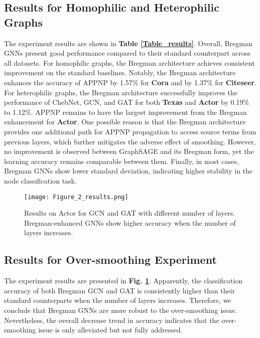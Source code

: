 \documentclass{article}
\begin{document}
\subsection{Results for Homophilic and Heterophilic Graphs}
The experiment results are shown in \textbf{Table \ref{Table_results}}. Overall, Bregman GNNs present good performance compared to their standard counterpart across all datasets. For homophilic graphs, the Bregman architecture achieves consistent improvement on the standard baselines. Notably, the Bregman architecture enhances the accuracy of APPNP by 1.57\% for \textbf{Cora} and by 1.37\% for \textbf{Citeseer}. For heterophilic graphs, the Bregman architecture successfully improves the performance of ChebNet, GCN, and GAT for both \textbf{Texas} and \textbf{Actor} by 0.19\% to 1.12\%. APPNP remains to have the largest improvement from the Bregman enhancement for \textbf{Actor}. One possible reason is that the Bregman architecture provides one additional path for APPNP propagation to access source terms from previous layers, which further mitigates the adverse effect of smoothing. However, no improvement is observed between GraphSAGE and its Bregman form, yet the learning accuracy remains comparable between them. Finally, in most cases, Bregman GNNs show lower standard deviation, indicating higher stability in the node classification task.









\begin{figure}[t]
\begin{minipage}[b]{1.0\linewidth}
  \centering
\centerline{\texttt{[image: Figure\_2\_results.png]}}
\end{minipage}
\caption{Results on Actor for GCN and GAT with different number of layers. Bregman-enhanced GNNs show higher accuracy when the number of layers increases.}
\label{fig:oversmotthing}
\end{figure}

\subsection{Results for Over-smoothing Experiment}
The experiment results are presented in \textbf{Fig. \ref{fig:oversmotthing}}. Apparently, the classification accuracy of both Bregman GCN and GAT is consistently higher than their standard counterparts when the number of layers increases. Therefore, we conclude that Bregman GNNs are more robust to the over-smoothing issue. Nevertheless, the overall decrease trend in accuracy indicates that the over-smoothing issue is only alleviated but not fully addressed.
\end{document}
